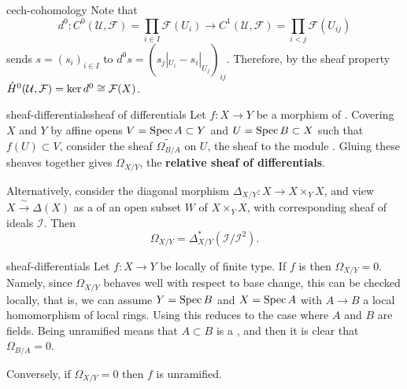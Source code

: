 \begin{example}{cech-cohomology}
    Note that 
    \[ d^0 : C^0(\mathcal{U}, \mathcal{F}) = \prod_{i \in I} \mathcal{F}(U_i) \to C^1(\mathcal{U}, \mathcal{F}) = \prod_{i < j} \mathcal{F}(U_{ij}) \]
    sends $s = (s_i)_{i \in I}$ to $d^0 s = \left(s_j|_{U_i} - s_i|_{U_j}\right)_{ij}$. Therefore, by the sheaf property $\hat{H}^0(\mathcal{U}, \mathcal{F}) = \ker d^0 \cong \mathcal{F}(X)$.
\end{example}

\begin{topic}{sheaf-differentials}{sheaf of differentials}
    Let $f : X \to Y$ be a morphism of . Covering $X$ and $Y$ by affine opens $V = \operatorname{Spec} A \subset Y$ and $U = \operatorname{Spec} B \subset X$ such that $f(U) \subset V$, consider the sheaf $\widetilde{\Omega_{B/A}}$ on $U$, the sheaf  to the module . Gluing these sheaves together gives $\Omega_{X/Y}$, the \textbf{relative sheaf of differentials}.
    
    Alternatively, consider the diagonal morphism $\Delta_{X/Y} : X \to X \times_Y X$, and view $X \xrightarrow{\sim{}} \Delta(X)$ as a  of an open subset $W$ of $X \times_Y X$, with corresponding sheaf of ideals $\mathcal{I}$. Then
    \[ \Omega_{X/Y} = \Delta_{X/Y}^*(\mathcal{I}/\mathcal{I}^2) . \]
\end{topic}

\begin{example}{sheaf-differentials}
    Let $f : X \to Y$ be locally of finite type. If $f$ is  then $\Omega_{X/Y} = 0$. Namely, since $\Omega_{X/Y}$ behaves well with respect to base change, this can be checked locally, that is, we can assume $Y = \operatorname{Spec} B$ and $X = \operatorname{Spec} A$ with $A \to B$ a local homomorphism of local rings. Using  this reduces to the case where $A$ and $B$ are fields. Being unramified means that $A \subset B$ is a , and then it is clear that $\Omega_{B/A} = 0$.
    
    Conversely, if $\Omega_{X/Y} = 0$ then $f$ is unramified.
\end{example}

